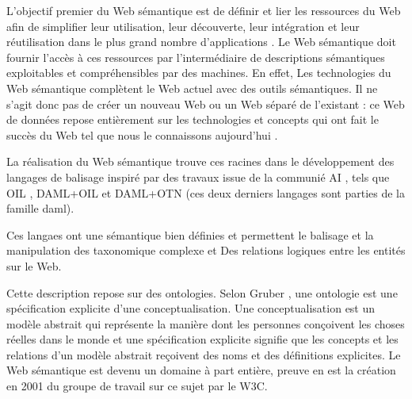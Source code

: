 


    L'objectif premier du Web sémantique est de définir et lier les
    ressources du Web afin de simplifier leur utilisation, leur
    découverte, leur intégration et leur réutilisation dans le plus
    grand nombre d'applications \cite{berners2001semantic}. Le Web
    sémantique doit fournir l'accès à ces ressources par
    l'intermédiaire de descriptions sémantiques exploitables et
    compréhensibles par des machines. En effet, Les technologies du
    Web sémantique complètent le Web actuel avec des outils
    sémantiques. Il ne s'agit donc pas de créer un nouveau Web ou un
    Web séparé de l'existant : ce Web de données repose entièrement
    sur les technologies et concepts qui ont fait le succès du Web tel
    que nous le connaissons aujourd'hui \cite{bertails2010web}.

    La réalisation du Web sémantique trouve ces racines dans le
    développement des langages de balisage inspiré par des travaux
    issue de la communié AI \cite{mcilraith2001semantic}, tels que
    \textsc{OIL} \cite{fensel2001oil}, \textsc{DAML+OIL}
    \cite{horrocks2002daml+oil} et \textsc{DAML+OTN}
    \cite{mcguinness2003daml} (ces deux derniers langages sont parties
    de la famille \acrshort{daml}).

    Ces langaes ont une sémantique bien définies et permettent le
    balisage et la manipulation des taxonomique complexe et Des
    relations logiques entre les entités sur le
    Web. \cite{fensel2000creating}

    
    Cette description repose sur des ontologies. Selon Gruber
    \cite{gruber1993translation}, une ontologie est une spécification
    explicite d'une conceptualisation. Une conceptualisation est un
    modèle abstrait qui représente la manière dont les personnes
    conçoivent les choses réelles dans le monde et une spécification
    explicite signifie que les concepts et les relations d'un modèle
    abstrait reçoivent des noms et des définitions explicites. Le Web
    sémantique est devenu un domaine à part entière, preuve en est la
    création en 2001 du groupe de travail sur ce sujet par le
    \textsc{W3C}.


